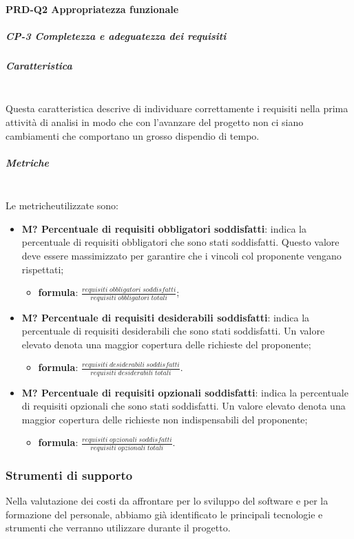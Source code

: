 		\paragraph{PRD-Q2 Appropriatezza funzionale}
		\subparagraph{CP-3 Completezza e adeguatezza dei requisiti}
		\subparagraph*{Caratteristica}\mbox{}\\ [1mm]
		Questa caratteristica descrive di individuare correttamente i requisiti nella prima attività di analisi in modo che con l'avanzare del progetto non ci siano cambiamenti che comportano un grosso dispendio di tempo.
		\subparagraph*{Metriche}\mbox{}\\ [1mm]
		Le metriche\glosp utilizzate sono:
			\begin{itemize}
				\item \textbf{M? Percentuale di requisiti obbligatori soddisfatti}: indica la percentuale di requisiti obbligatori che sono stati soddisfatti. Questo valore deve essere massimizzato per garantire che i vincoli col proponente vengano rispettati;
				\begin{itemize}
					\item[] \textbf{formula}: $\frac{requisiti \; obbligatori \; soddisfatti}{requisiti \; obbligatori \; totali}$;
				\end{itemize} 
				\item \textbf{M? Percentuale di requisiti desiderabili soddisfatti}:
				indica la percentuale di requisiti desiderabili che sono stati soddisfatti. Un valore elevato denota una maggior copertura delle richieste del proponente;
				\begin{itemize}
					\item[] \textbf{formula}: $\frac{requisiti \; desiderabili \; soddisfatti}{requisiti \; desiderabili \; totali}$.
				\end{itemize} 
				\item \textbf{M? Percentuale di requisiti opzionali soddisfatti}:
				indica la percentuale di requisiti opzionali che sono stati soddisfatti. Un valore elevato denota una maggior copertura delle richieste non indispensabili  del proponente;
				\begin{itemize}
					\item[] \textbf{formula}: $\frac{requisiti \; opzionali \; soddisfatti}{requisiti \; opzionali \; totali}$.
				\end{itemize} 
			\end{itemize}
		
		\subsubsection{Strumenti di supporto}
		Nella valutazione dei costi da affrontare per lo sviluppo del software e per la formazione del personale, abbiamo già identificato le principali tecnologie e strumenti che verranno utilizzare durante il progetto\glo.
